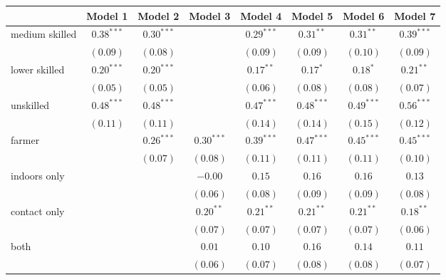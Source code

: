 
\begin{table}
\begin{center}
\begin{tabular}{l c c c c c c c}
\hline
 & Model 1 & Model 2 & Model 3 & Model 4 & Model 5 & Model 6 & Model 7 \\
\hline
medium skilled & $0.38^{***}$ & $0.30^{***}$ &              & $0.29^{***}$ & $0.31^{**}$   & $0.31^{**}$   & $0.39^{***}$  \\
               & $(0.09)$     & $(0.08)$     &              & $(0.09)$     & $(0.09)$      & $(0.10)$      & $(0.09)$      \\
lower skilled  & $0.20^{***}$ & $0.20^{***}$ &              & $0.17^{**}$  & $0.17^{*}$    & $0.18^{*}$    & $0.21^{**}$   \\
               & $(0.05)$     & $(0.05)$     &              & $(0.06)$     & $(0.08)$      & $(0.08)$      & $(0.07)$      \\
unskilled      & $0.48^{***}$ & $0.48^{***}$ &              & $0.47^{***}$ & $0.48^{***}$  & $0.49^{***}$  & $0.56^{***}$  \\
               & $(0.11)$     & $(0.11)$     &              & $(0.14)$     & $(0.14)$      & $(0.15)$      & $(0.12)$      \\
farmer         &              & $0.26^{***}$ & $0.30^{***}$ & $0.39^{***}$ & $0.47^{***}$  & $0.45^{***}$  & $0.45^{***}$  \\
               &              & $(0.07)$     & $(0.08)$     & $(0.11)$     & $(0.11)$      & $(0.11)$      & $(0.10)$      \\
indoors only   &              &              & $-0.00$      & $0.15$       & $0.16$        & $0.16$        & $0.13$        \\
               &              &              & $(0.06)$     & $(0.08)$     & $(0.09)$      & $(0.09)$      & $(0.08)$      \\
contact only   &              &              & $0.20^{**}$  & $0.21^{**}$  & $0.21^{**}$   & $0.21^{**}$   & $0.18^{**}$   \\
               &              &              & $(0.07)$     & $(0.07)$     & $(0.07)$      & $(0.07)$      & $(0.06)$      \\
both           &              &              & $0.01$       & $0.10$       & $0.16$        & $0.14$        & $0.11$        \\
               &              &              & $(0.06)$     & $(0.07)$     & $(0.08)$      & $(0.08)$      & $(0.07)$      \\

\end{tabular}
\end{center}
\end{table}
